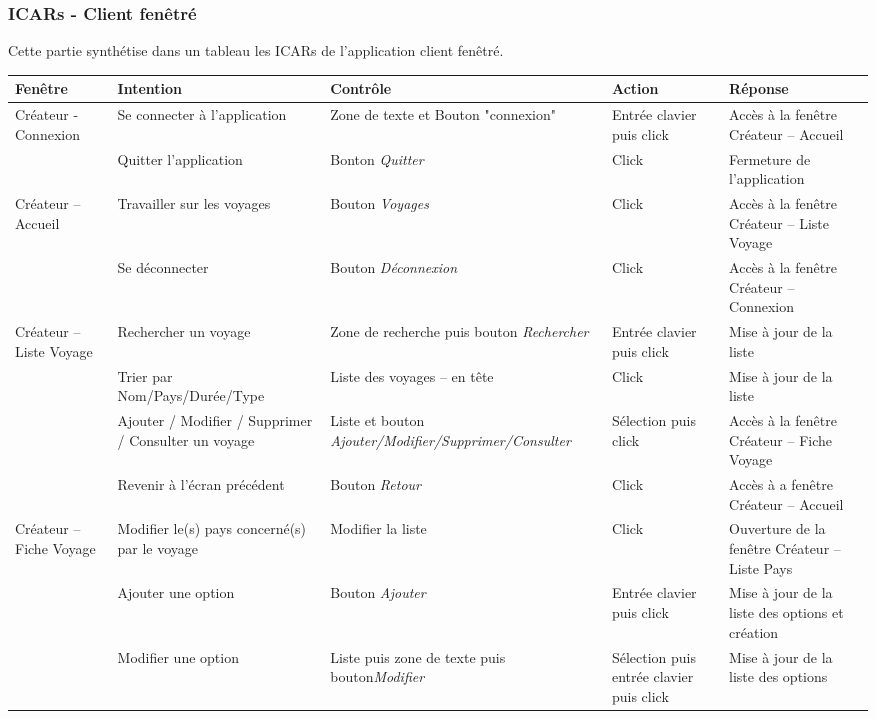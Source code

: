 \documentclass[12pt]{article}
\begin{document}
\subsubsection{ICARs - Client fenêtré}
Cette partie synthétise dans un tableau les ICARs de l'application client fenêtré.\\
\begin{center}
\begin{footnotesize}


\begin{supertabular}{|p{2cm}|p{3cm}|p{3.5cm}|p{2cm}|p{4cm}|}
\hline         
Fenêtre & Intention & Contrôle & Action & Réponse \\ \hline
Créateur - Connexion & Se connecter à l'application & Zone de texte et Bouton "connexion" & Entrée clavier puis click & Accès à la fenêtre Créateur – Accueil   \\ \hline
& Quitter l'application & Bonton \emph{Quitter} & Click & Fermeture de l'application \\ \hline
Créateur – Accueil & Travailler sur les voyages & Bouton \emph{Voyages} & Click & Accès à la fenêtre Créateur – Liste Voyage \\ \hline
 & Se déconnecter & Bouton \emph{Déconnexion} & Click & Accès à la fenêtre Créateur – Connexion \\ \hline
Créateur – Liste Voyage & Rechercher un voyage & Zone de recherche puis bouton \emph{Rechercher} & Entrée clavier puis click & Mise à jour de la liste \\ \hline
 & Trier par Nom/Pays/Durée/Type & Liste des voyages – en tête & Click & Mise à jour de la liste \\ \hline
 & Ajouter / Modifier / Supprimer / Consulter un voyage & Liste et bouton \emph{Ajouter/Modifier/Supprimer/Consulter} & Sélection puis click & Accès à la fenêtre Créateur – Fiche Voyage \\ \hline
 & Revenir à l’écran précédent & Bouton \emph{Retour} & Click & Accès à a fenêtre Créateur – Accueil \\ \hline
Créateur – Fiche Voyage & Modifier le(s) pays concerné(s) par le voyage & Modifier la liste & Click & Ouverture de la  fenêtre Créateur – Liste Pays \\ \hline
 & Ajouter une option & Bouton \emph{Ajouter} & Entrée clavier puis click & Mise à jour de la  liste des options et création \\ \hline
 & Modifier une option & Liste puis zone de texte puis bouton\emph{Modifier} & Sélection puis entrée clavier puis click & Mise à jour de la  liste des options \\ \hline

\end{supertabular}
\end{footnotesize}
\end{center}
\end{document}
